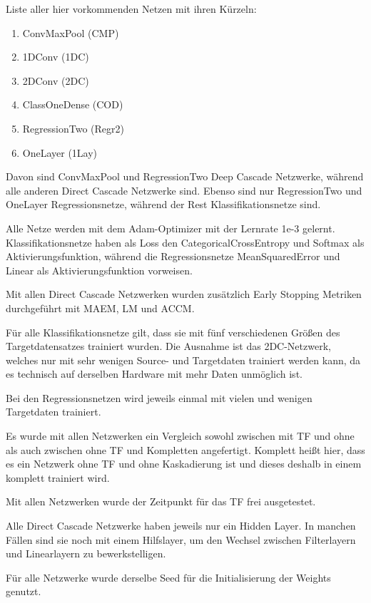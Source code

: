 
Liste aller hier vorkommenden Netzen mit ihren Kürzeln:

\begin{enumerate}
    \item ConvMaxPool (CMP)
    \item 1DConv (1DC)
    \item 2DConv (2DC)
    \item ClassOneDense (COD)
    \item RegressionTwo (Regr2)
    \item OneLayer (1Lay)
\end{enumerate}

Davon sind ConvMaxPool und RegressionTwo Deep Cascade Netzwerke, während alle anderen Direct Cascade Netzwerke sind. 
Ebenso sind nur RegressionTwo und OneLayer Regressionsnetze, während der Rest Klassifikationsnetze sind. 

Alle Netze werden mit dem Adam-Optimizer mit der Lernrate 1e-3 gelernt. Klassifikationsnetze haben als Loss den 
CategoricalCrossEntropy und Softmax als Aktivierungsfunktion, während die Regressionsnetze MeanSquaredError und Linear als 
Aktivierungsfunktion vorweisen. 

Mit allen Direct Cascade Netzwerken wurden zusätzlich Early Stopping Metriken durchgeführt mit MAEM, LM und ACCM. 

Für alle Klassifikationsnetze gilt, dass sie mit fünf verschiedenen Größen des Targetdatensatzes trainiert wurden. Die Ausnahme ist das 
2DC-Netzwerk, welches nur mit sehr wenigen Source- und Targetdaten trainiert werden kann, da es technisch auf derselben Hardware mit mehr 
Daten unmöglich ist. 

Bei den Regressionsnetzen wird jeweils einmal mit vielen und wenigen Targetdaten trainiert. 

Es wurde mit allen Netzwerken ein Vergleich sowohl zwischen mit TF und ohne als auch zwischen ohne TF und Kompletten angefertigt. 
Komplett heißt hier, dass es ein Netzwerk ohne TF und ohne Kaskadierung ist und dieses deshalb in einem komplett trainiert wird. 

Mit allen Netzwerken wurde der Zeitpunkt für das TF frei ausgetestet. 

Alle Direct Cascade Netzwerke haben jeweils nur ein Hidden Layer. In manchen Fällen sind sie noch mit einem Hilfslayer, um den Wechsel 
zwischen Filterlayern und Linearlayern zu bewerkstelligen. 

Für alle Netzwerke wurde derselbe Seed für die Initialisierung der Weights genutzt. 

